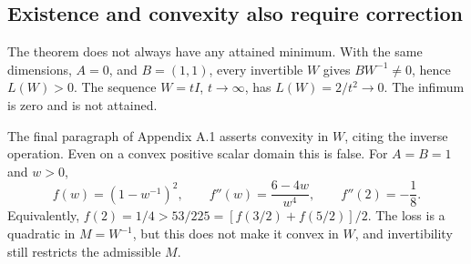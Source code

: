 \documentclass[10pt]{article}
\begin{document}
\subsection*{Existence and convexity also require correction}
The theorem does not always have any attained minimum. With the same dimensions, \(A=0\), and \(B=(1,1)\), every invertible \(W\) gives \(BW^{-1}\ne0\), hence \(L(W)>0\). The sequence \(W=tI\), \(t\to\infty\), has \(L(W)=2/t^2\to0\). The infimum is zero and is not attained.\par
The final paragraph of Appendix A.1 asserts convexity in \(W\), citing the inverse operation. Even on a convex positive scalar domain this is false. For \(A=B=1\) and \(w>0\), \[f(w)=(1-w^{-1})^2,\qquad
 f''(w)=\frac{6-4w}{w^4},\qquad f''(2)=-\frac18.\] Equivalently, \(f(2)=1/4>53/225=[f(3/2)+f(5/2)]/2\). The loss is a quadratic in \(M=W^{-1}\), but this does not make it convex in \(W\), and invertibility still restricts the admissible \(M\).\par
\end{document}
